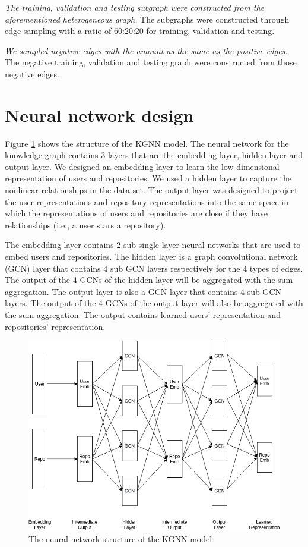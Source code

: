 \documentclass[11pt,twoside]{report}
\begin{document}
\textit{The training, validation and testing subgraph were constructed from the aforementioned heterogeneous graph.} The subgraphs were constructed through edge sampling with a ratio of 60:20:20 for training, validation and testing.

\textit{We sampled negative edges with the amount as the same as the positive edges.} The negative training, validation and testing graph were constructed from those negative edges.

\section{Neural network design}
Figure \ref{fig:kgnn_structure} shows the structure of the KGNN model. The neural network for the knowledge graph contains 3 layers that are the embedding layer, hidden layer and output layer. We designed an embedding layer to learn the low dimensional representation of users and repositories. We used a hidden layer to capture the nonlinear relationships in the data set. The output layer was designed to project the user representations and repository representations into the same space in which the representations of users and repositories are close if they have relationships (i.e., a user stars a repository). 

The embedding layer contains 2 sub single layer neural networks that are used to embed users and repositories. The hidden layer is a graph convolutional network (GCN) \cite{kipf_semi-supervised_2017} layer that contains 4 sub GCN layers respectively for the 4 types of edges. The output of the 4 GCNs of the hidden layer will be aggregated with the sum aggregation. The output layer is also a GCN layer that contains 4 sub GCN layers. The output of the 4 GCNs of the output layer will also be aggregated with the sum aggregation. The output contains learned users' representation and repositories' representation.

\begin{figure}[H]
    \centering
    \includegraphics[scale=0.6]{KGCN Structure.png}
    \caption{The neural network structure of the KGNN model}
    \label{fig:kgnn_structure}
\end{figure}
\end{document}
